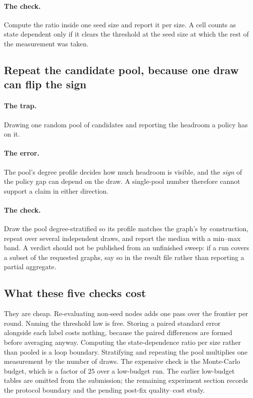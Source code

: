 \paragraph{The check.} Compute the ratio inside one seed size and report it per size. A cell counts
as state dependent only if it clears the threshold at the seed size at which the rest of the
measurement was taken.

\subsection{Repeat the candidate pool, because one draw can flip the sign}

\paragraph{The trap.} Drawing one random pool of candidates and reporting the headroom a policy has
on it.

\paragraph{The error.} The pool's degree profile decides how much headroom is visible, and the
\emph{sign} of the policy gap can depend on the draw. A single-pool number therefore cannot support
a claim in either direction.

\paragraph{The check.} Draw the pool degree-stratified so its profile matches the graph's by
construction, repeat over several independent draws, and report the median with a min--max band.
A verdict should not be published from an unfinished sweep: if a run covers a subset of the
requested graphs, say so in the result file rather than reporting a partial aggregate.

\subsection{What these five checks cost}

They are cheap. Re-evaluating non-seed nodes adds one pass over the frontier per round. Naming the
threshold law is free. Storing a paired standard error alongside each label costs nothing, because
the paired differences are formed before averaging anyway. Computing the state-dependence ratio per
size rather than pooled is a loop boundary. Stratifying and repeating the pool multiplies one
measurement by the number of draws. The expensive check is the Monte-Carlo budget, which is a
factor of $25$ over a low-budget run.  The earlier low-budget tables are omitted from the
submission; the remaining experiment section records the protocol boundary and the pending
post-fix quality--cost study.
